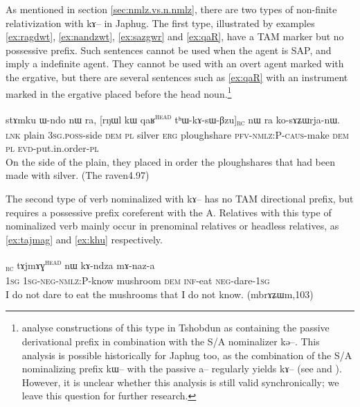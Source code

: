 \documentclass[oldfontcommands,oneside,a4paper,11pt]{article}
\newcommand{\ipa}[1]{{\phon #1}} %
\newcommand{\tete}{\textsuperscript{\textsc{head}}}
\newcommand{\rc}{\textsubscript{\textsc{rc}}}
\begin{document}
As mentioned in section \ref{sec:nmlz.vs.n.nmlz}, there are two types of  non-finite relativization with \ipa{kɤ}-- in Japhug. The first type, illustrated by examples  \ref{ex:ragdwt}, \ref{ex:nandzwt}, \ref{ex:sazgwr} and \ref{ex:qaR}, have a TAM marker but no possessive prefix. Such sentences cannot be used when the agent is  SAP, and imply a indefinite agent. They cannot be used with an overt agent marked with the ergative, but there are several sentences such as \ref{ex:qaR} with an instrument marked in the ergative placed before the head noun.\footnote{ \citet{jacksonlin07} analyse constructions of this type in Tshobdun as   containing the passive derivational prefix in combination with the S/A nominalizer \ipa{kə}--. This analysis is possible historically for Japhug too, as the combination of the S/A nominalizing prefix \ipa{kɯ}-- with the passive \ipa{a}-- regularly yields \ipa{kɤ}-- (see \citealt{jacques07passif} and \citealt{jacques12demotion}). However, it is unclear whether this analysis is still valid synchronically; we leave this question for further research.}

\begin{exe}
   \ex \label{ex:qaR}
\gll  \ipa{tɕe}  	\ipa{stɤmku}  	\ipa{ɯ-ndo}  	\ipa{nɯ} \ipa{ra,}  	[\ipa{rŋɯl}  	\ipa{kɯ} \ipa{qaʁ}\tete{}  	\ipa{tʰɯ-kɤ-sɯ-βzu}]\rc{} 	\ipa{nɯ} \ipa{ra}  	\ipa{ko-sɤʑɯrja-nɯ.}   \\
\textsc{lnk} plain \textsc{3sg.poss}-side \textsc{dem} \textsc{pl} 
silver \textsc{erg} ploughshare \textsc{pfv-nmlz:P-caus}-make  \textsc{dem} \textsc{pl} \textsc{evd}-put.in.order-\textsc{pl}\\
  \glt On the side of the plain, they placed in order the ploughshares that had been made with silver. (The raven4.97)
   \end{exe}  


The second type of verb nominalized with \ipa{kɤ}-- has no TAM directional prefix, but requires a possessive prefix coreferent with the A. Relatives with this type of nominalized verb mainly occur in prenominal relatives or headless relatives, as \ref{ex:tajmag} and \ref{ex:khu} respectively.

     \begin{exe}
   \ex \label{ex:tajmag}
   \gll
[\ipa{aʑo}  	\ipa{a-mɤ-kɤ-sɯz}]\rc{}  	\ipa{tɤjmɤɣ}\tete{}  	\ipa{nɯ}  	\ipa{kɤ-ndza}  	\ipa{mɤ-naz-a}  \\
\textsc{1sg} \textsc{1sg-neg-nmlz:P}-know mushroom \textsc{dem} \textsc{inf}-eat \textsc{neg}-dare-\textsc{1sg} \\
\glt I do not dare to eat the mushrooms that I do not know. (mbrɤʑɯm,103)
\end{exe}
 
\end{document}

